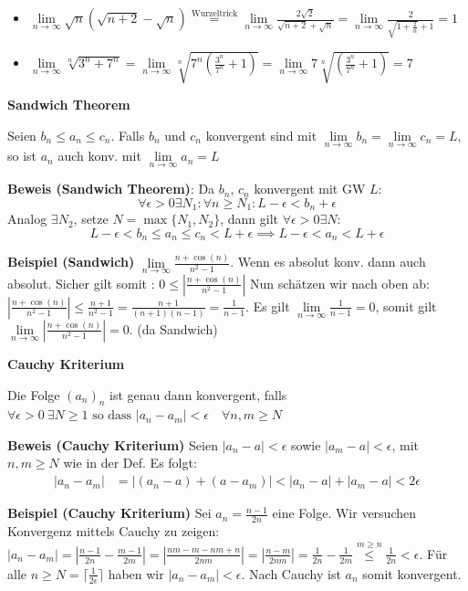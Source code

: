 \documentclass[25pt]{sciposter}
\newcommand{\limm}{\lim\limits_{n \to \infty}}
\newenvironment{method}[1]{\begin{mdframed}[backgroundcolor=blue!10,innertopmargin=15pt, innerbottommargin=15pt, nobreak=true]
		\textbf{#1 }
	}
	{ 
	\end{mdframed}
}
\begin{document}
\begin{multicols}{3}
\begin{itemize}
	\item $\limm \sqrt{n} (\sqrt{n + 2} - \sqrt{n}) \stackrel{\text{Wurzeltrick}}{=} \limm \frac{2 \sqrt{2}}{\sqrt{n+2} + \sqrt{n}} = \limm  \frac{2}{\sqrt{1 + \frac{2}{n}} + 1} = 1$
	
	\item $ \limm \sqrt[n]{3^n + 7^n} = \limm \sqrt[n]{7^n ( \frac{3^n}{7^n} + 1)} = \limm 7 \sqrt[n]{ (\frac{3^n}{7^n} + 1)} = 7$
	
\end{itemize}


\begin{method}{Sandwich Theorem}
Seien $b_n \leq a_n \leq c_n$. Falls $b_n$ und $c_n$ konvergent sind mit $\lim \limits_{n \to \infty } b_n = \lim \limits_{n \to \infty } c_n = L$, so ist $a_n$ auch konv. mit $\lim \limits_{n \to \infty } a_n = L$
\end{method}
\textbf{Beweis (Sandwich Theorem)}: 
Da $b_n$, $c_n$ konvergent mit GW $L$:
$$\forall \epsilon > 0 \exists N_1 : \forall n \geq N_1 : L-\epsilon < b_n + \epsilon$$
Analog  $ \exists N_2$, setze $N = \max\{N_1, N_2\}$, dann gilt $\forall \epsilon > 0 \exists N$:
$$L-\epsilon < b_n \leq a_n \leq c_n < L + \epsilon \implies L - \epsilon < a_n < L + \epsilon$$


\textbf{Beispiel (Sandwich)}
$\limm \frac{n + \cos(n)}{n^2 -1}$. Wenn es absolut konv. dann auch absolut. Sicher gilt somit : $0 \leq \left|\frac{n + \cos(n)}{n^2 -1}\right|$ Nun schätzen wir nach oben ab: $\left|\frac{n + \cos(n)}{n^2 -1}\right| \leq \frac{n+1}{n^2 - 1} = \frac{n+1}{(n+1)(n-1)} = \frac{1}{n-1}$. Es gilt $\limm \frac{1}{n-1} = 0$, somit gilt $\limm \left|\frac{n + \cos(n)}{n^2 -1}\right| = 0$. (da Sandwich)



\begin{method}{Cauchy Kriterium}
	Die Folge $(a_n)_n$ ist genau dann konvergent, falls $\forall  \epsilon > 0 \ \exists N \geq 1 \text{ so dass } |a_n - a_m| < \epsilon \quad \forall n,m \geq N$
\end{method}

\textbf{Beweis (Cauchy Kriterium)} Seien $|a_n - a |< \epsilon$ sowie $|a_m - a| < \epsilon$, mit $n,m \geq N$ wie in der Def. Es folgt: 
\begin{align*}
	|a_n - a_m| &= |(a_n-a) + (a - a_m)| < |a_n - a| + |a_m - a| < 2\epsilon
\end{align*}

\textbf{Beispiel (Cauchy Kriterium)}
Sei $a_n = \frac{n-1}{2n}$ eine Folge. Wir versuchen Konvergenz mittels Cauchy zu zeigen:\\
$|a_n - a_m| = |\frac{n-1}{2n} - \frac{m-1}{2m}| = |\frac{nm-m-nm+n}{2nm}| = |\frac{n-m}{2nm}| = \frac{1}{2n} - \frac{1}{2m} \stackrel{m\geq n}{\leq} \frac{1}{2n} < \epsilon$. Für alle $n \geq N = \lceil \frac{1}{2\epsilon} \rceil$ haben wir $|a_n - a_m| < \epsilon$. Nach Cauchy ist $a_n$ somit konvergent.


\end{multicols}
\end{document}
